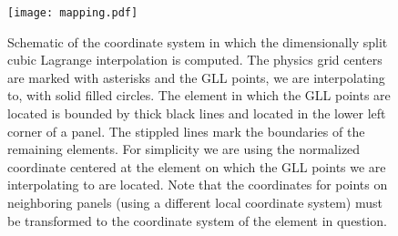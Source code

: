 \documentclass{ametsoc}
\begin{document}
{%
\begin{figure}[t]
\begin{center}
\noindent\texttt{[image: mapping.pdf]}\\
\end{center}
\caption{Schematic of the coordinate system in which the dimensionally split cubic Lagrange interpolation is computed.  The physics grid centers are marked with asterisks and the GLL points, we are interpolating to, with solid filled circles. The element in which the GLL points are located is  bounded by  thick black lines and located in the lower left corner of a panel. The stippled lines mark the boundaries of the remaining elements. For simplicity we are using the normalized coordinate centered at the element on which the GLL points we are interpolating to are located. Note that the coordinates for points on neighboring panels (using a different local coordinate system) must be transformed to the coordinate system of the element in question.}
\label{fig:mapping}
\end{figure}







}
\end{document}
